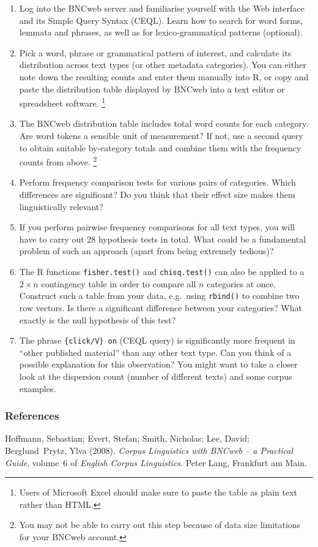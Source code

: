 \documentclass[a4paper,12pt]{article}
\begin{document}
\begin{enumerate}
\item Log into the BNCweb server and familiarise yourself with the Web interface and its Simple Query Syntax (CEQL).  
  Learn how to search for word forms, lemmata and phrases, as well as for lexico-grammatical patterns (optional).
\item Pick a word, phrase or grammatical pattern of interest, and calculate its distribution across text types
  (or other metadata categories).  You can either note down the resulting counts and enter them manually into R,
  or copy and paste the distribution table displayed by BNCweb into a text editor or spreadsheet software.%
  \footnote{Users of Microsoft Excel should make sure to paste the table as plain text rather than HTML.}
\item The BNCweb distribution table includes total word counts for each category.  Are word tokens a sensible unit
  of measurement?  If not, use a second query to obtain suitable by-category totals and combine them with the frequency counts from above.%
  \footnote{You may not be able to carry out this step because of data size limitations for your BNCweb account.}
\item Perform frequency comparison tests for various pairs of categories.  Which differences are significant?  
  Do you think that their effect size makes them linguistically relevant?
\item If you perform pairwise frequency comparisons for all text types, you
  will have to carry out 28 hypothesis tests in total.  What could be a
  fundamental problem of such an approach (apart from being extremely
  tedious)?
\item The R functions \texttt{fisher.test()} and \texttt{chisq.test()} can
  also be applied to a $2\times n$ contingency table in order to compare all
  $n$ categories at once.  Construct such a table from your data, e.g.\ using
  \texttt{rbind()} to combine two row vectors.  Is there a significant difference 
  between your categories?  What exactly is the null hypothesis of this test?
\item The phrase \verb_{click/V} on_ (CEQL query) is significantly more
  frequent in ``other published material'' than any other text type.  Can you
  think of a possible explanation for this observation?  You might want to
  take a closer look at the dispersion count (number of different texts) and
  some corpus examples.
\end{enumerate}

\subsubsection*{References}

Hoffmann, Sebastian; Evert, Stefan; Smith, Nicholas; Lee, David; Berglund~Prytz, Ylva (2008).
{\em Corpus Linguistics with {BNCweb} -- a Practical Guide}, volume~6 of {\em English Corpus Linguistics}.
Peter Lang, Frankfurt am Main.
\end{document}
